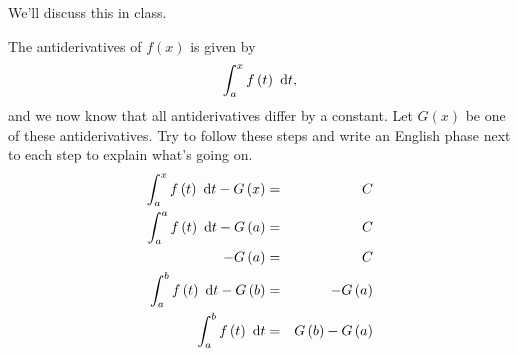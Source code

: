 \documentclass[12pt,addpoints, answers, fleqn]{exam}
\begin{document}
\begin{questions}
\begin{solution}
We'll discuss this in class.
\end{solution}

\question The antiderivatives of $f \left( x \right)$ is given by
\[
\int_a^x f \left( t \right) \ {\rm{d}}t,
\]
and we now know that all antiderivatives differ by a constant. Let $G\left( x \right)$ be one of these antiderivatives. Try to follow these steps and write an English phase next to each step to explain what's going on. 
\begin{eqnarray*}
\int_a^x f \left( t \right) \ {\rm{d}}t - G\left( x \right) &=& C\\
\int_a^a f \left( t \right) \ {\rm{d}}t - G\left( a \right) &=& C\\
-G\left( a \right) &=& C\\
\int_a^b f \left( t \right) \ {\rm{d}}t - G\left( b \right) &=& -G\left( a \right)\\
\int_a^b f \left( t \right) \ {\rm{d}}t  &=& G\left( b \right) -G\left( a \right)\\
\end{eqnarray*}

\end{questions}
\end{document}
